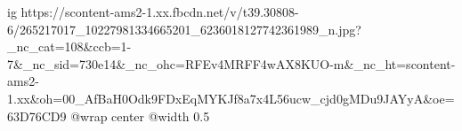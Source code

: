  
 
 
 
 

\ifcmt
  ig https://scontent-ams2-1.xx.fbcdn.net/v/t39.30808-6/265217017_10227981334665201_6236018127742361989_n.jpg?_nc_cat=108&ccb=1-7&_nc_sid=730e14&_nc_ohc=RFEv4MRFF4wAX8KUO-m&_nc_ht=scontent-ams2-1.xx&oh=00_AfBaH0Odk9FDxEqMYKJf8a7x4L56ucw_cjd0gMDu9JAYyA&oe=63D76CD9
  @wrap center
  @width 0.5
\fi
